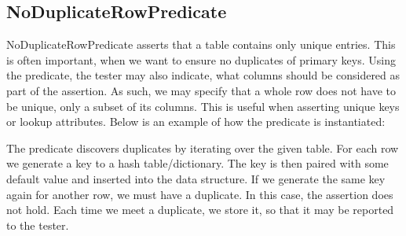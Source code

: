 \subsection{NoDuplicateRowPredicate}
NoDuplicateRowPredicate asserts that a table contains only unique entries. This is often important, when we want to ensure no duplicates of primary keys. Using the predicate, the tester may also indicate, what columns should be considered as part of the assertion. As such, we may specify that a whole row does not have to be unique, only a subset of its columns. This is useful when asserting unique keys or lookup attributes. Below is an example of how the predicate is instantiated:

The predicate discovers duplicates by iterating over the given table. For each row we generate a key to a hash table/dictionary. The key is then paired with some default value and inserted into the data structure. If we generate the same key again for another row, we must have a duplicate. In this case, the assertion does not hold. Each time we meet a duplicate, we store it, so that it may be reported to the tester.